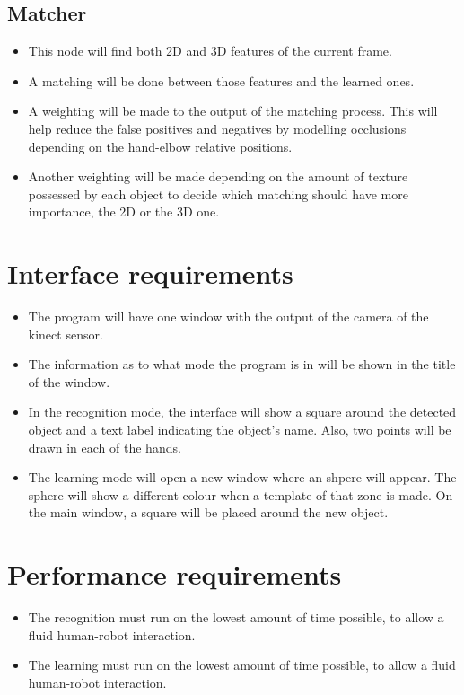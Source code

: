 \documentclass{article}
\begin{document}
\subsection{Matcher}
\begin{itemize}
	\item This node will find both 2D and 3D features of the current frame. 
	\item A matching will be done between those features and the learned ones. 
	\item A weighting will be made to the output of the matching process. This will help reduce the false positives and negatives by modelling occlusions depending on the hand-elbow relative positions. 
	\item Another weighting will be made depending on the amount of texture possessed by each object to decide which matching should have more importance, the 2D or the 3D one. 

\end{itemize}

\section{Interface requirements}

\begin{itemize}
\item The program will have one window with the output of the camera of the kinect sensor. 
\item The information as to what mode the program is in will be shown in the title of the window.
\item In the recognition mode, the interface will show a square around the detected object and a text label indicating the object's name. Also, two points will be drawn in each of the hands. 
\item The learning mode will open a new window where an shpere will appear. The sphere will show a different colour when a template of that zone is made. On the main window, a square will be placed around the new object. 

\end{itemize}





\section{Performance requirements}

\begin{itemize}
\item The recognition must run on the lowest amount of time possible, to allow a fluid human-robot interaction.
\item The learning must run on the lowest amount of time possible, to allow a fluid human-robot interaction.
\end{itemize}
\end{document}
